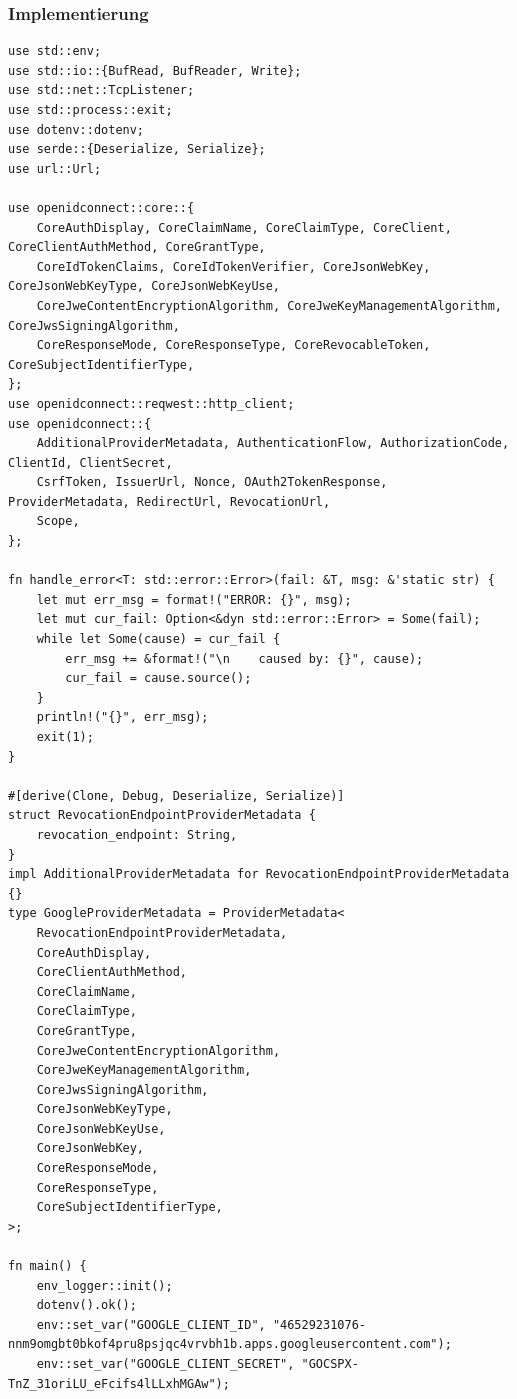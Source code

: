 \documentclass[notitlepage, hidelinks]{article}
\begin{document}
\subsubsection{Implementierung}
\begin{lstlisting}[language={[Sharp]C},frame=single,caption=OAuth2 und OICD in Rust,label=owaspfivegood]
use std::env;
use std::io::{BufRead, BufReader, Write};
use std::net::TcpListener;
use std::process::exit;
use dotenv::dotenv;
use serde::{Deserialize, Serialize};
use url::Url;

use openidconnect::core::{
    CoreAuthDisplay, CoreClaimName, CoreClaimType, CoreClient, CoreClientAuthMethod, CoreGrantType,
    CoreIdTokenClaims, CoreIdTokenVerifier, CoreJsonWebKey, CoreJsonWebKeyType, CoreJsonWebKeyUse,
    CoreJweContentEncryptionAlgorithm, CoreJweKeyManagementAlgorithm, CoreJwsSigningAlgorithm,
    CoreResponseMode, CoreResponseType, CoreRevocableToken, CoreSubjectIdentifierType,
};
use openidconnect::reqwest::http_client;
use openidconnect::{
    AdditionalProviderMetadata, AuthenticationFlow, AuthorizationCode, ClientId, ClientSecret,
    CsrfToken, IssuerUrl, Nonce, OAuth2TokenResponse, ProviderMetadata, RedirectUrl, RevocationUrl,
    Scope,
};

fn handle_error<T: std::error::Error>(fail: &T, msg: &'static str) {
    let mut err_msg = format!("ERROR: {}", msg);
    let mut cur_fail: Option<&dyn std::error::Error> = Some(fail);
    while let Some(cause) = cur_fail {
        err_msg += &format!("\n    caused by: {}", cause);
        cur_fail = cause.source();
    }
    println!("{}", err_msg);
    exit(1);
}

#[derive(Clone, Debug, Deserialize, Serialize)]
struct RevocationEndpointProviderMetadata {
    revocation_endpoint: String,
}
impl AdditionalProviderMetadata for RevocationEndpointProviderMetadata {}
type GoogleProviderMetadata = ProviderMetadata<
    RevocationEndpointProviderMetadata,
    CoreAuthDisplay,
    CoreClientAuthMethod,
    CoreClaimName,
    CoreClaimType,
    CoreGrantType,
    CoreJweContentEncryptionAlgorithm,
    CoreJweKeyManagementAlgorithm,
    CoreJwsSigningAlgorithm,
    CoreJsonWebKeyType,
    CoreJsonWebKeyUse,
    CoreJsonWebKey,
    CoreResponseMode,
    CoreResponseType,
    CoreSubjectIdentifierType,
>;

fn main() {
    env_logger::init();
    dotenv().ok();
    env::set_var("GOOGLE_CLIENT_ID", "46529231076-nnm9omgbt0bkof4pru8psjqc4vrvbh1b.apps.googleusercontent.com");
    env::set_var("GOOGLE_CLIENT_SECRET", "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");



\end{lstlisting}
\end{document}
